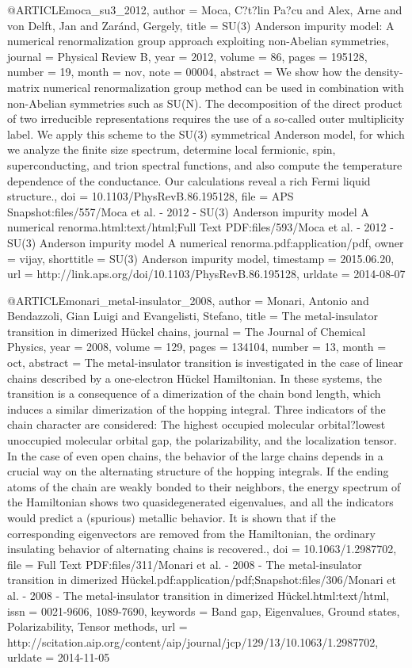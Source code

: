 @ARTICLE{moca_su3_2012,
  author = {Moca, C?t?lin Pa?cu and Alex, Arne and von Delft, Jan and Zaránd,
	Gergely},
  title = {{SU}(3) {Anderson} impurity model: {A} numerical renormalization
	group approach exploiting non-{Abelian} symmetries},
  journal = {Physical Review B},
  year = {2012},
  volume = {86},
  pages = {195128},
  number = {19},
  month = nov,
  note = {00004},
  abstract = {We show how the density-matrix numerical renormalization group method
	can be used in combination with non-Abelian symmetries such as SU(N).
	The decomposition of the direct product of two irreducible representations
	requires the use of a so-called outer multiplicity label. We apply
	this scheme to the SU(3) symmetrical Anderson model, for which we
	analyze the finite size spectrum, determine local fermionic, spin,
	superconducting, and trion spectral functions, and also compute the
	temperature dependence of the conductance. Our calculations reveal
	a rich Fermi liquid structure.},
  doi = {10.1103/PhysRevB.86.195128},
  file = {APS Snapshot:files/557/Moca et al. - 2012 - SU(3) Anderson impurity model A numerical renorma.html:text/html;Full Text PDF:files/593/Moca et al. - 2012 - SU(3) Anderson impurity model A numerical renorma.pdf:application/pdf},
  owner = {vijay},
  shorttitle = {{SU}(3) {Anderson} impurity model},
  timestamp = {2015.06.20},
  url = {http://link.aps.org/doi/10.1103/PhysRevB.86.195128},
  urldate = {2014-08-07}
}

@ARTICLE{monari_metal-insulator_2008,
  author = {Monari, Antonio and Bendazzoli, Gian Luigi and Evangelisti, Stefano},
  title = {The metal-insulator transition in dimerized {Hückel} chains},
  journal = {The Journal of Chemical Physics},
  year = {2008},
  volume = {129},
  pages = {134104},
  number = {13},
  month = oct,
  abstract = {The metal-insulator transition is investigated in the case of linear
	chains described by a one-electron Hückel Hamiltonian. In these systems,
	the transition is a consequence of a dimerization of the chain bond
	length, which induces a similar dimerization of the hopping integral.
	Three indicators of the chain character are considered: The highest
	occupied molecular orbital?lowest unoccupied molecular orbital gap,
	the polarizability, and the localization tensor. In the case of even
	open chains, the behavior of the large chains depends in a crucial
	way on the alternating structure of the hopping integrals. If the
	ending atoms of the chain are weakly bonded to their neighbors, the
	energy spectrum of the Hamiltonian shows two quasidegenerated eigenvalues,
	and all the indicators would predict a (spurious) metallic behavior.
	It is shown that if the corresponding eigenvectors are removed from
	the Hamiltonian, the ordinary insulating behavior of alternating
	chains is recovered.},
  doi = {10.1063/1.2987702},
  file = {Full Text PDF:files/311/Monari et al. - 2008 - The metal-insulator transition in dimerized       Hückel.pdf:application/pdf;Snapshot:files/306/Monari et al. - 2008 - The metal-insulator transition in    dimerized Hückel.html:text/html},
  issn = {0021-9606, 1089-7690},
  keywords = {Band gap, Eigenvalues, Ground states, Polarizability, Tensor methods},
  url = {http://scitation.aip.org/content/aip/journal/jcp/129/13/10.1063/1.2987702},
  urldate = {2014-11-05}
}

